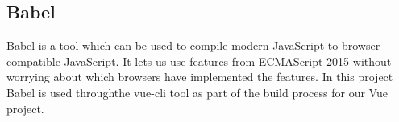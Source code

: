\subsection{Babel}
Babel is a tool which can be used to compile modern JavaScript to browser compatible JavaScript. It lets us use features from ECMAScript 2015 without worrying about which browsers have implemented the features. In this project Babel is used throughthe vue-cli tool as part of the build process for our Vue project.